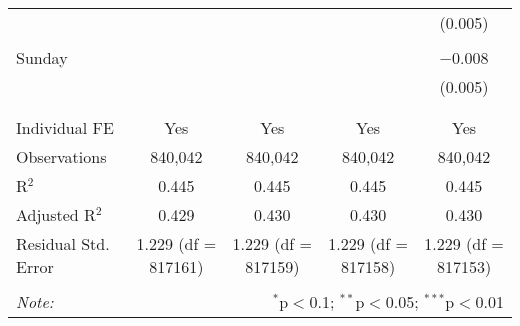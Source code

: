 \documentclass[
]{article}
\begin{document}
\begin{table}[!htbp]
{\begin{tabular}{@{\extracolsep{5pt}}lcccc}
  &  &  &  & (0.005) \\ 
  & & & & \\ 
 Sunday &  &  &  & $-$0.008 \\ 
  &  &  &  & (0.005) \\ 
  & & & & \\ 
\hline \\[-1.8ex] 
Individual FE & Yes & Yes & Yes & Yes \\ 
Observations & 840,042 & 840,042 & 840,042 & 840,042 \\ 
R$^{2}$ & 0.445 & 0.445 & 0.445 & 0.445 \\ 
Adjusted R$^{2}$ & 0.429 & 0.430 & 0.430 & 0.430 \\ 
Residual Std. Error & 1.229 (df = 817161) & 1.229 (df = 817159) & 1.229 (df = 817158) & 1.229 (df = 817153) \\ 
\hline 
\hline \\[-1.8ex] 
\textit{Note:}  & \multicolumn{4}{r}{$^{*}$p$<$0.1; $^{**}$p$<$0.05; $^{***}$p$<$0.01} \\ 
\end{tabular}
} 
\end{table} 
\newpage
\end{document}
